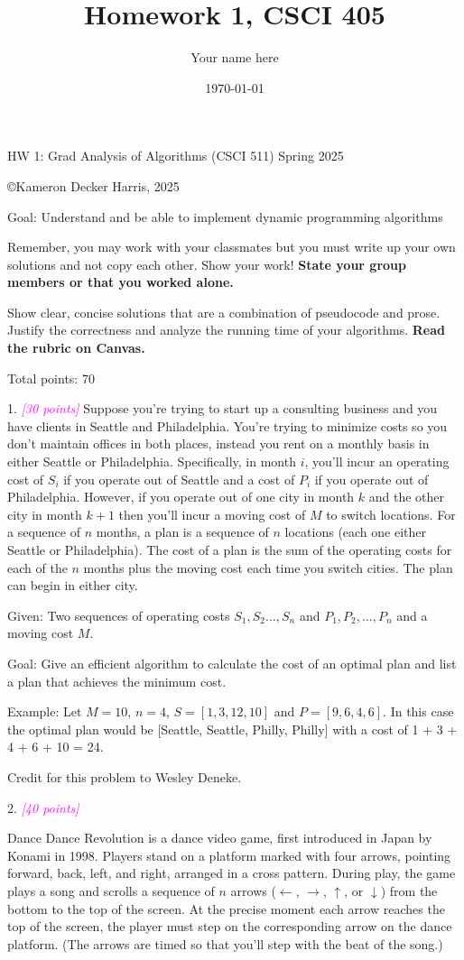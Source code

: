 \documentclass{article}
\title{\vspace{-.5in}Homework 1, CSCI 405}
\date{\today}
\author{Your name here}
\newcommand{\points}[1]{\small\textcolor{magenta}{\emph{[#1 points]}} \normalsize}
\begin{document}
{\Large HW 1: Grad Analysis of Algorithms  (CSCI 511) Spring 2025}

\copyright Kameron Decker Harris, 2025

Goal: Understand and be able to implement dynamic programming algorithms

Remember, you may work with your classmates but you must write up your
own solutions and not copy each other.
Show your work!
{\bf State your group members or that you worked alone.}

Show clear, concise solutions that are a combination of
pseudocode and prose.
Justify the correctness and analyze the running time of your algorithms.
{\bf Read the rubric on Canvas.}

Total points: 70

\clearpage

1. \points{30} 
Suppose you're trying to start up a consulting business and you have clients in Seattle and Philadelphia.
You're trying to minimize costs so you don't maintain offices in both places, instead you rent on a monthly basis in either Seattle or Philadelphia.
Specifically, in month $i$, you'll incur an operating cost of $S_i$ if you operate out of Seattle and a cost of $P_i$ if you operate out of Philadelphia.
However, if you operate out of one city in month $k$ and the other city in month $k+1$ then you'll incur a moving cost of $M$ to switch locations.
For a sequence of $n$ months, a plan is a sequence of $n$ locations (each one either Seattle or Philadelphia).
The cost of a plan is the sum of the operating costs for each of the $n$ months plus the moving cost each time you switch cities.
The plan can begin in either city.

Given: Two sequences of operating costs $S_1, S_2 \ldots, S_n$ and $P_1, P_2, \ldots, P_n$  and a moving cost $M$.

Goal: Give an efficient algorithm to calculate the cost of an optimal plan and list a plan that achieves the minimum cost.

Example:
Let $M=10$, $n=4$, $S=[1,3,12,10]$ and $P=[9,6,4,6]$.
In this case the optimal plan would be [Seattle, Seattle, Philly, Philly] with a cost of 1 + 3 + 4 + 6 + 10 = 24.

Credit for this problem to Wesley Deneke.

2. \points{40}

Dance Dance Revolution is a dance video game, first introduced in Japan by Konami in 1998.
Players stand on a platform marked with four arrows, pointing forward, back, left, and right, arranged in a cross pattern.
During play, the game plays a song and scrolls a sequence of $n$ arrows
($\leftarrow$, $\rightarrow$, $\uparrow$, or $\downarrow$)
from the bottom to the top of the screen.
At the precise moment each arrow reaches the top of the screen, the player must step on the
corresponding arrow on the dance platform.
(The arrows are timed so that you’ll step with the beat of the song.)
\end{document}
